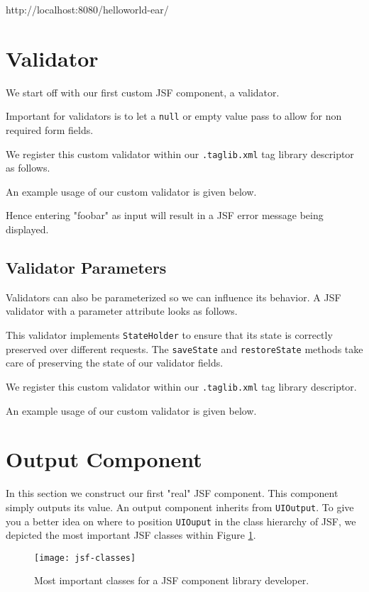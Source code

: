 http://localhost:8080/helloworld-ear/

\section{Validator}
\label{sec:validator}
We start off with our first custom JSF component, a validator.

Important for validators is to let a \texttt{null} or empty value pass to allow for non required form fields.

We register this custom validator within our \texttt{.taglib.xml} tag library descriptor as follows.


An example usage of our custom validator is given below.

Hence entering "foobar" as input will result in a JSF error message being displayed.


\subsection{Validator Parameters}
Validators can also be parameterized so we can influence its behavior. 
A JSF  validator with a parameter attribute looks as follows.

This validator implements \texttt{StateHolder} to ensure that its state is correctly preserved over different requests.
The \texttt{saveState} and \texttt{restoreState} methods take care of preserving the state of our validator fields.

We register this custom validator within our \texttt{.taglib.xml} tag library descriptor.


An example usage of our custom validator is given below.


\section{Output Component}
In this section we construct our first "real" JSF component.
This component simply outputs its value.
An output component inherits from \texttt{UIOutput}.
To give you a better idea on where to position \texttt{UIOuput} in the class hierarchy of JSF,
we depicted the most important JSF classes within Figure \ref{fig:jsf-classes}.
\begin{figure}[htbp]
	\begin{center}
		\texttt{[image: jsf-classes]}
		\caption{Most important classes for a JSF component library developer.}
		\label{fig:jsf-classes}
	\end{center}
\end{figure}

